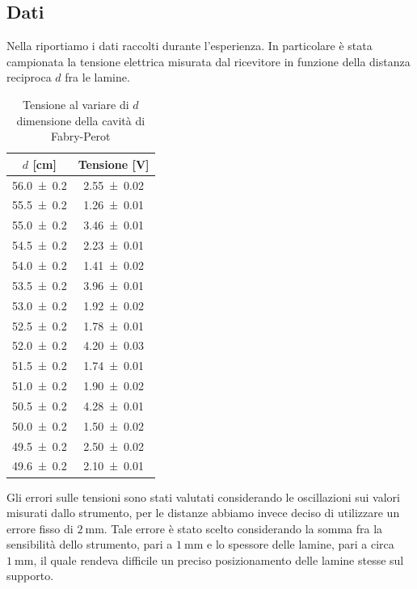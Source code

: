 \documentclass[a4paper]{article}
\begin{document}
\subsection{Dati}
Nella  riportiamo i dati raccolti durante l'esperienza. In particolare è stata campionata la tensione elettrica misurata dal ricevitore in funzione della distanza reciproca $d$ fra le lamine.
\begin{table}[H]
\centering
\caption{Tensione al variare di $d$ dimensione della cavità di Fabry-Perot}
\label{tab:dati_Fabry_Perot}
\begin{tabular}{|c|c|}
\hline $d$ [\si{\centi\metre}] & Tensione [\si{\volt}] \\
\hline
\num{56.0 \pm 0.2} & \num{2.55 \pm 0.02} \\
\num{55.5 \pm 0.2} & \num{1.26 \pm 0.01} \\
\num{55.0 \pm 0.2} & \num{3.46 \pm 0.01} \\
\num{54.5 \pm 0.2} & \num{2.23 \pm 0.01} \\
\num{54.0 \pm 0.2} & \num{1.41 \pm 0.02} \\
\num{53.5 \pm 0.2} & \num{3.96 \pm 0.01} \\
\num{53.0 \pm 0.2} & \num{1.92 \pm 0.02} \\
\num{52.5 \pm 0.2} & \num{1.78 \pm 0.01} \\
\num{52.0 \pm 0.2} & \num{4.20 \pm 0.03} \\
\num{51.5 \pm 0.2} & \num{1.74 \pm 0.01} \\
\num{51.0 \pm 0.2} & \num{1.90 \pm 0.02} \\
\num{50.5 \pm 0.2} & \num{4.28 \pm 0.01} \\
\num{50.0 \pm 0.2} & \num{1.50 \pm 0.02} \\
\num{49.5 \pm 0.2} & \num{2.50 \pm 0.02} \\
\num{49.6 \pm 0.2} & \num{2.10 \pm 0.01} \\
\hline
\end{tabular}
\end{table}
Gli errori sulle tensioni sono stati valutati considerando le oscillazioni sui valori misurati dallo strumento, per le distanze abbiamo invece deciso di utilizzare un errore fisso di $\SI{2}{\milli\metre}$. Tale errore è stato scelto considerando la somma fra la sensibilità dello strumento, pari a $\SI{1}{\milli\metre}$ e lo spessore delle lamine, pari a circa $\SI{1}{\milli\metre}$, il quale rendeva difficile un preciso posizionamento delle lamine stesse sul supporto.
\end{document}
